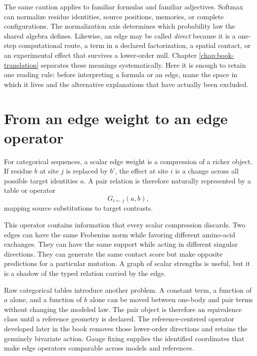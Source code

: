 The same caution applies to familiar formulas and familiar adjectives.  Softmax can normalize
residue identities, source positions, memories, or complete configurations.  The normalization
axis determines which probability law the shared algebra defines.  Likewise, an edge may be called \emph{direct}
because it is a one-step computational route, a term in a declared factorization, a spatial
contact, or an experimental effect that survives a lower-order null.  Chapter
\ref{chap:book-translation} separates these
meanings systematically.  Here it is enough to retain one reading rule: before interpreting a
formula or an edge, name the space in which it lives and the alternative explanations that have
actually been excluded.

\section{From an edge weight to an edge operator}

For categorical sequences, a scalar edge weight is a compression of a richer object.  If residue
$b$ at site $j$ is replaced by $b'$, the effect at site $i$ is a change across all possible target
identities $a$.  A pair relation is therefore naturally represented by a table or
operator
\begin{equation}
G_{i\leftarrow j}(a,b),
\end{equation}
mapping source substitutions to target contrasts.

This operator contains information that every scalar compression discards.  Two edges can have
the same Frobenius norm while favoring different amino-acid exchanges.  They can have the same
support while acting in different singular directions.  They can generate the same contact score
but make opposite predictions for a particular mutation.  A graph of scalar strengths is useful,
but it is a shadow of the typed relation carried by the edge.

Raw categorical tables introduce another problem.  A constant term, a function of $a$ alone, and
a function of $b$ alone can be moved between one-body and pair terms without changing the modeled
law.  The pair object is therefore an equivalence class until a reference geometry is declared.
The reference-centered operator developed later in the book removes those lower-order directions and
retains the genuinely bivariate action.  Gauge fixing supplies the identified coordinates that
make edge operators comparable across models and references.

